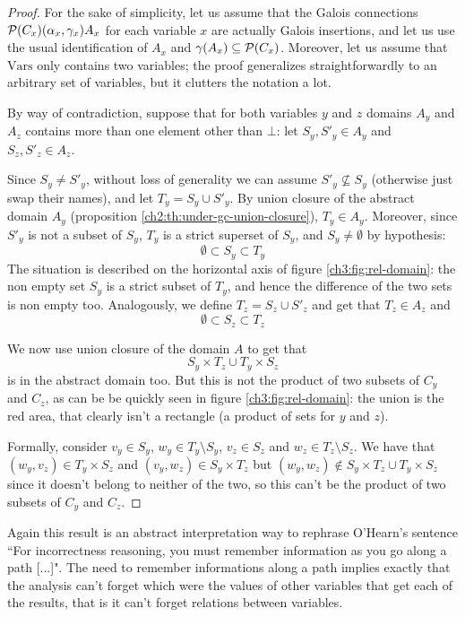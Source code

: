 \begin{proof}
	For the sake of simplicity, let us assume that the Galois connections $\mathcal{P}(C_x) (\alpha_x, \gamma_x) A_x$ for each variable $x$ are actually Galois insertions, and let us use the usual identification of $A_x$ and $\gamma(A_x) \subseteq \mathcal{P}(C_x)$.
	Moreover, let us assume that $\text{Vars}$ only contains two variables; the proof generalizes straightforwardly to an arbitrary set of variables, but it clutters the notation a lot.

	By way of contradiction, suppose that for both variables $y$ and $z$ domains $A_y$ and $A_z$ contains more than one element other than $\bot$: let $S_y, S'_y \in A_y$ and $S_z, S'_z \in A_z$.

	Since $S_y \neq S'_y$, without loss of generality we can assume $S'_y \nsubseteq S_y$ (otherwise just swap their names), and let $T_y = S_y \cup S'_y$. By union closure of the abstract domain $A_y$ (proposition \ref{ch2:th:under-gc-union-closure}), $T_y \in A_y$. Moreover, since $S'_y$ is not a subset of $S_y$, $T_y$ is a strict superset of $S_y$, and $S_y \neq \emptyset$ by hypothesis:
	\[
	\emptyset \subset S_y \subset T_y
	\]
	The situation is described on the horizontal axis of figure \ref{ch3:fig:rel-domain}: the non empty set $S_y$ is a strict subset of $T_y$, and hence the difference of the two sets is non empty too.
	Analogously, we define $T_z = S_z \cup S'_z$ and get that $T_z \in A_z$ and
	\[
	\emptyset \subset S_z \subset T_z
	\]

	We now use union closure of the domain $A$ to get that
	\[
	S_y \times T_z \cup T_y \times S_z
	\]
	is in the abstract domain too. But this is not the product of two subsets of $C_y$ and $C_z$, as can be be quickly seen in figure \ref{ch3:fig:rel-domain}: the union is the red area, that clearly isn't a rectangle (a product of sets for $y$ and $z$).

	Formally, consider $v_y \in S_y$, $w_y \in T_y \setminus S_y$, $v_z \in S_z$ and $w_z \in T_z \setminus S_z$. We have that $(w_y, v_z) \in T_y \times S_z$ and $(v_y, w_z) \in S_y \times T_z$ but $(w_y, w_z) \notin S_y \times T_z \cup T_y \times S_z$ since it doesn't belong to neither of the two, so this can't be the product of two subsets of $C_y$ and $C_z$.
\end{proof}

Again this result is an abstract interpretation way to rephrase O'Hearn's sentence \cite{ohearn-incorrectness-logic} ``For incorrectness reasoning, you must remember information as you go along a path [...]".
The need to remember informations along a path implies exactly that the analysis can't forget which were the values of other variables that get each of the results, that is it can't forget relations between variables.

